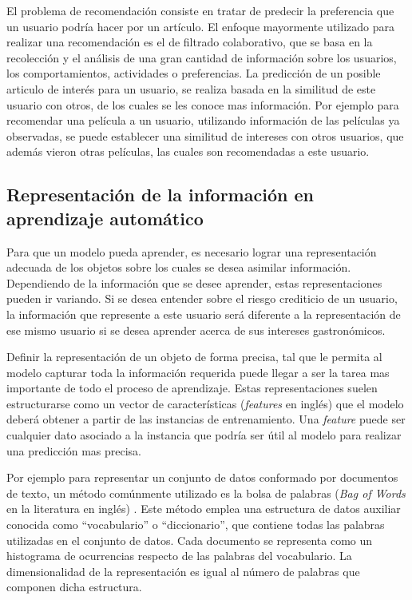 \documentclass[a4paper,11pt,spanish]{book}
\begin{document}
	El problema de recomendación consiste en tratar de predecir la preferencia que un usuario podría hacer por un artículo. 
	El enfoque mayormente utilizado para realizar una recomendación es el de filtrado colaborativo, que se basa en la recolección y el análisis de una gran cantidad 
	de información sobre los usuarios, los comportamientos, actividades o preferencias. 
	La predicción de un posible articulo de interés para un usuario, se realiza basada en la similitud de este usuario con otros, de los cuales se les conoce 
	mas información. 
	Por ejemplo para recomendar una película a un usuario, utilizando información de las películas ya observadas, se puede
	establecer una similitud de intereses con otros usuarios, que además vieron otras películas, las cuales son recomendadas a este usuario.

    \subsection{Representación de la información en aprendizaje automático} \label{sec:representacion}
      Para que un modelo pueda aprender, es necesario lograr una representación adecuada de los objetos sobre los cuales se desea asimilar información.
      Dependiendo de la información que se desee aprender, estas representaciones pueden ir variando. 
      Si se desea entender sobre el riesgo crediticio de un usuario, la información que represente a este usuario será diferente a la representación de ese mismo 
      usuario si se desea aprender acerca de sus intereses gastronómicos.

      Definir la representación de un objeto de forma precisa, tal que le permita al modelo capturar toda la información requerida puede llegar a ser la tarea mas importante de todo el 
      proceso de aprendizaje.
      Estas representaciones suelen estructurarse como un vector de características (\emph{features} en inglés) que el modelo deberá obtener a partir de las instancias 
      de entrenamiento.
      Una \emph{feature} puede ser cualquier dato asociado a la instancia que podría ser útil al modelo para realizar una predicción mas precisa.

      Por ejemplo para representar un conjunto de datos conformado por documentos de texto, un método comúnmente utilizado es la bolsa de palabras (\emph{Bag of Words} 
      en la literatura en inglés) \cite{Salton:BoW}. 
      Este método emplea una estructura de datos auxiliar conocida como ``vocabulario'' o ``diccionario'', que contiene todas las palabras utilizadas en el conjunto de datos. 
      Cada documento se representa como un histograma de ocurrencias respecto de las palabras del vocabulario. 
      La dimensionalidad de la representación es igual al número de palabras que componen dicha estructura.
\end{document}
